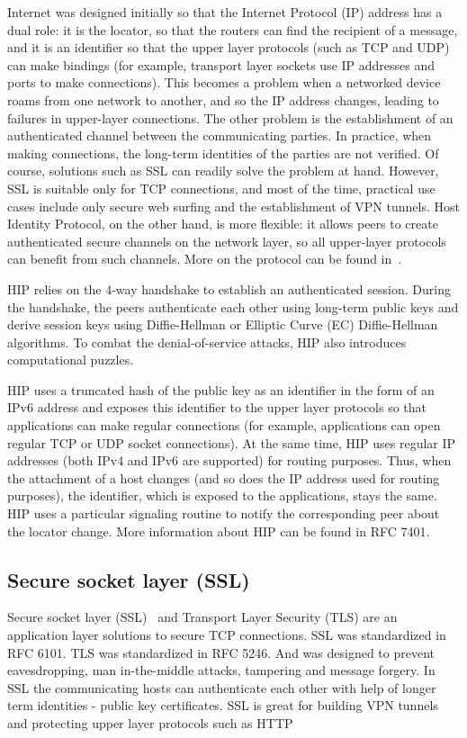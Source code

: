 Internet was designed initially so that the Internet Protocol (IP) address has a dual role: it 
is the locator, so that the routers can find the recipient of a message, and it is an identifier 
so that the upper layer protocols (such as TCP and UDP) can make bindings (for example, transport 
layer sockets use IP addresses and ports to make connections). This becomes a problem when a networked 
device roams from one network to another, and so the IP address changes, leading to failures in 
upper-layer connections. The other problem is the establishment of an authenticated channel between 
the communicating parties. In practice, when making connections, the long-term identities of the parties 
are not verified. Of course, solutions such as SSL can readily solve the problem at hand. However, SSL 
is suitable only for TCP connections, and most of the time, practical use cases include only secure web 
surfing and the establishment of VPN tunnels. Host Identity Protocol, on the other hand, is more flexible: 
it allows peers to create authenticated secure channels on the network layer, so all upper-layer protocols 
can benefit from such channels. More on the protocol can be found in~\cite{gurtov:hip}.

HIP relies on the 4-way handshake to establish an authenticated session. During the handshake, the 
peers authenticate each other using long-term public keys and derive session keys using Diffie-Hellman 
or Elliptic Curve (EC) Diffie-Hellman algorithms. To combat the denial-of-service attacks, HIP also 
introduces computational puzzles. 

HIP uses a truncated hash of the public key as an identifier in the form of an IPv6 address and 
exposes this identifier to the upper layer protocols so that applications can make regular 
connections (for example, applications can open regular TCP or UDP socket connections). At the 
same time, HIP uses regular IP addresses (both IPv4 and IPv6 are supported) for routing purposes. 
Thus, when the attachment of a host changes (and so does the IP address used for routing purposes), 
the identifier, which is exposed to the applications, stays the same. HIP uses a particular 
signaling routine to notify the corresponding peer about the locator change. More information 
about HIP can be found in RFC 7401. 

\subsection{Secure socket layer (SSL)}
Secure socket layer (SSL)~\cite{ssl} and Transport Layer Security (TLS) are an application 
layer solutions to secure TCP connections. SSL was standardized in RFC 6101. 
TLS was standardized in RFC 5246. And was designed to prevent eavesdropping, man 
in-the-middle attacks, tampering and message forgery. In SSL the communicating 
hosts can authenticate each other with help of longer term identities - public key certificates.
SSL is great for building VPN tunnels and protecting upper layer protocols such as HTTP


